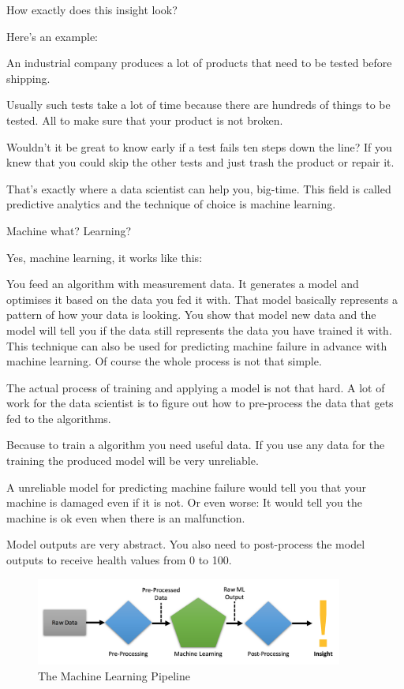 \documentclass[12pt, numbers=noenddot]{scrreprt} %
\begin{document}
How exactly does this insight look?

Here’s an example:

An industrial company produces a lot of products that need to be tested before shipping.

Usually such tests take a lot of time because there are hundreds of things to be tested. All to make sure that your product is not broken.

Wouldn’t it be great to know early if a test fails ten steps down the line? If you knew that you could skip the other tests and just trash the product or repair it.

That’s exactly where a data scientist can help you, big-time. This field is called predictive analytics and the technique of choice is machine learning.

Machine what? Learning?

Yes, machine learning, it works like this:

You feed an algorithm with measurement data.
It generates a model and optimises it based on the data you fed it with. That model basically represents a pattern of how your data is looking. 
You show that model new data and the model will tell you if the data still represents the data you have trained it with.
This technique can also be used for predicting machine failure in advance with machine learning. Of course the whole process is not that simple.

The actual process of training and applying a model is not that hard. A lot of work for the data scientist is to figure out how to pre-process the data that gets fed to the algorithms.

Because to train a algorithm you need useful data. If you use any data for the training the produced model will be very unreliable.

A unreliable model for predicting machine failure would tell you that your machine is damaged even if it is not. Or even worse: It would tell you the machine is ok even when there is an malfunction.

Model outputs are very abstract. You also need to post-process the model outputs to receive health values from 0 to 100.

\begin{figure}[htbp]
  \centering
     \includegraphics[width=0.9\textwidth]{images/Machine-Learning-Pipeline}
  \caption{The Machine Learning Pipeline}
  \label{fig:Bild1}
\end{figure}
\end{document}
